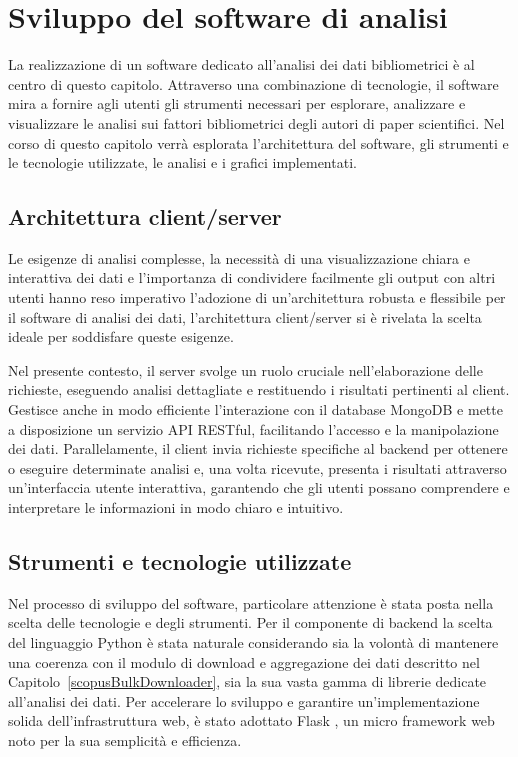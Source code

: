 \chapter{Sviluppo del software di analisi}
La realizzazione di un software dedicato all'analisi dei dati bibliometrici è al centro di questo capitolo. Attraverso una combinazione di tecnologie, il software mira a fornire agli utenti gli strumenti necessari per esplorare, analizzare e visualizzare le analisi sui fattori bibliometrici degli autori di paper scientifici.
Nel corso di questo capitolo verrà esplorata l'architettura del software, gli strumenti e le tecnologie utilizzate, le analisi e i grafici implementati.

\section{Architettura client/server}
Le esigenze di analisi complesse, la necessità di una visualizzazione chiara e interattiva dei dati e l'importanza di condividere facilmente gli output con altri utenti hanno reso imperativo l'adozione di un'architettura robusta e flessibile per il software di analisi dei dati, l'architettura client/server si è rivelata la scelta ideale per soddisfare queste esigenze.

Nel presente contesto, il server svolge un ruolo cruciale nell'elaborazione delle richieste, eseguendo analisi dettagliate e restituendo i risultati pertinenti al client. Gestisce anche in modo efficiente l'interazione con il database MongoDB e mette a disposizione un servizio API RESTful, facilitando l'accesso e la manipolazione dei dati. Parallelamente, il client invia richieste specifiche al backend per ottenere o eseguire determinate analisi e, una volta ricevute, presenta i risultati attraverso un'interfaccia utente interattiva, garantendo che gli utenti possano comprendere e interpretare le informazioni in modo chiaro e intuitivo.

\section{Strumenti e tecnologie utilizzate}
Nel processo di sviluppo del software, particolare attenzione è stata posta nella scelta delle tecnologie e degli strumenti. Per il componente di backend la scelta del linguaggio Python è stata naturale considerando sia la volontà di mantenere una coerenza con il modulo di download e aggregazione dei dati descritto nel Capitolo~\ref{scopusBulkDownloader}, sia la sua vasta gamma di librerie dedicate all'analisi dei dati. Per accelerare lo sviluppo e garantire un'implementazione solida dell'infrastruttura web, è stato adottato Flask \cite{flask-github}, un micro framework web noto per la sua semplicità e efficienza.

